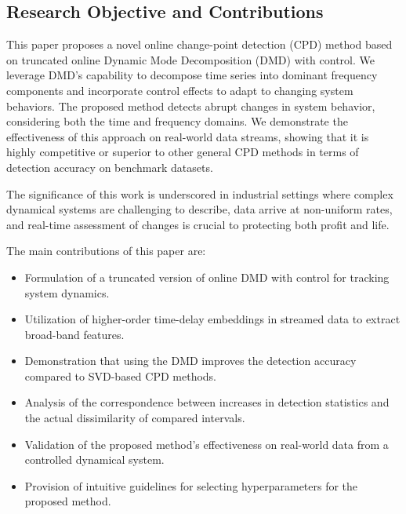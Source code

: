 \subsection{Research Objective and Contributions}
This paper proposes a novel online change-point detection (CPD) method based on truncated online Dynamic Mode Decomposition (DMD) with control. We leverage DMD's capability to decompose time series into dominant frequency components and incorporate control effects to adapt to changing system behaviors. The proposed method detects abrupt changes in system behavior, considering both the time and frequency domains. We demonstrate the effectiveness of this approach on real-world data streams, showing that it is highly competitive or superior to other general CPD methods in terms of detection accuracy on benchmark datasets.

The significance of this work is underscored in industrial settings where complex dynamical systems are challenging to describe, data arrive at non-uniform rates, and real-time assessment of changes is crucial to protecting both profit and life.

The main contributions of this paper are:
\begin{itemize}
	\item Formulation of a truncated version of online DMD with control for tracking system dynamics.
	\item Utilization of higher-order time-delay embeddings in streamed data to extract broad-band features.
	\item Demonstration that using the DMD improves the detection accuracy compared to SVD-based CPD methods.
	\item Analysis of the correspondence between increases in detection statistics and the actual dissimilarity of compared intervals.
	\item Validation of the proposed method's effectiveness on real-world data from a controlled dynamical system.
	\item Provision of intuitive guidelines for selecting hyperparameters for the proposed method.
\end{itemize}
